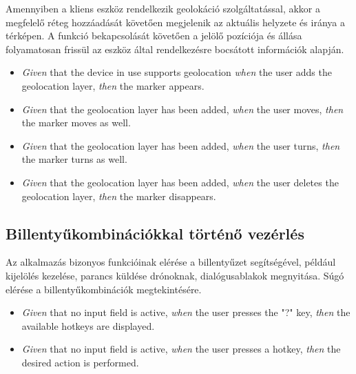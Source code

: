 Amennyiben a kliens eszköz rendelkezik geolokáció szolgáltatással, akkor a megfelelő réteg hozzáadását követően megjelenik az aktuális helyzete és iránya a térképen.
A funkció bekapcsolását követően a jelölő pozíciója és állása folyamatosan frissül az eszköz által rendelkezésre bocsátott információk alapján.

\begin {itemize}
  \item \textit{Given} that the device in use supports geolocation \textit{when} the user adds the geolocation layer, \textit{then} the marker appears.
  \item \textit{Given} that the geolocation layer has been added, \textit{when} the user moves, \textit{then} the marker moves as well.
  \item \textit{Given} that the geolocation layer has been added, \textit{when} the user turns, \textit{then} the marker turns as well.
  \item \textit{Given} that the geolocation layer has been added, \textit{when} the user deletes the geolocation layer, \textit{then} the marker disappears.
\end {itemize}


\subsection{Billentyűkombinációkkal történő vezérlés}

Az alkalmazás bizonyos funkcióinak elérése a billentyűzet segítségével, például kijelölés kezelése, parancs küldése drónoknak, dialógusablakok megnyitása.
Súgó elérése a billentyűkombinációk megtekintésére.

\begin {itemize}
  \item \textit{Given} that no input field is active, \textit{when} the user presses the "?" key, \textit{then} the available hotkeys are displayed.
  \item \textit{Given} that no input field is active, \textit{when} the user presses a hotkey, \textit{then} the desired action is performed.
\end {itemize}
